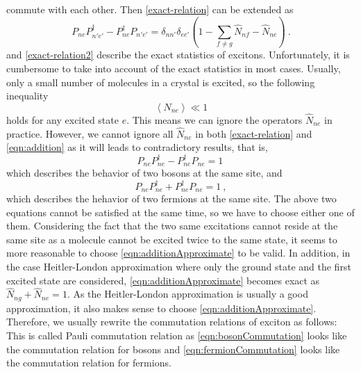commute with each other. Then \autoref{exact-relation} can be extended as 
\begin{equation}
P_{ne}P_{n'e'}^{\dagger}-P_{ne}^{\dagger}P_{n'e'}  =  \delta_{nn'}\delta_{ee'}\left(1-\sum_{f\neq g}\hat{N}_{nf} -\hat{N}_{ne} \right)  \ . \label{exact-relation2}
\end{equation}
 and \autoref{exact-relation2} describe the exact
statistics of excitons.  Unfortunately, it is cumbersome to take into account of the exact
statistics in most cases. Usually, only a small number of molecules in a crystal is excited, so the following inequality
\begin{equation}
\left\langle N_{ne} \right\rangle \ll 1 \label{condition-for-Bose-approx}
\end{equation}
holds for any excited state $e$. This means we can ignore the operators $\hat{N}_{ne}$ in practice. However, we cannot
ignore all $\hat{N}_{ne}$ in both \autoref{exact-relation} and \autoref{eqn:addition} as it will leads to contradictory 
results, that is,  
\begin{equation}
P_{ne} P_{ne}^{\dagger} - P_{ne}^{\dagger} P_{ne} = 1\  \label{eqn:subtractionApproximate}
\end{equation}
which describes the behavior of two bosons at the same site, 
and 
\begin{equation}
P_{ne} P_{ne}^{\dagger} + P_{ne}^{\dagger} P_{ne} = 1 \ , \label{eqn:additionApproximate}
\end{equation}
which describes the hehavior of two fermions at the same site. 
The above two equations cannot be satisfied at the same time, so we have to choose either one of them. Considering the 
fact that the two same excitations cannot reside at the same site as a molecule cannot be excited twice to the same state, 
it seems to more reasonable to choose \autoref{eqn:additionApproximate} to be valid. In addition, 
in the case Heitler-London approximation where only the ground state and the first excited state are considered, 
\autoref{eqn:additionApproximate} becomes exact as $ \hat{N}_{ng}  + \hat{N}_{ne}=1$. As the Heitler-London 
approximation is usually a good approximation, it also makes sense to choose \autoref{eqn:additionApproximate}. 
Therefore, we usually rewrite the commutation relations of exciton as follows:
This is called Pauli commutation relation as \autoref{eqn:bosonCommutation} looks like the commutation relation for 
bosons and \autoref{eqn:fermionCommutation} looks like the commutation relation for fermions. 


